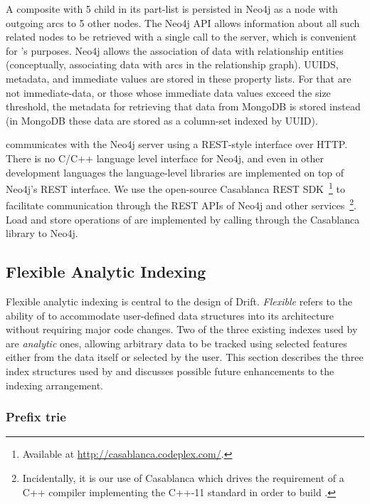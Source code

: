 A composite \dpart with 5 child \dparts in its part-list is persisted in Neo4j as a \dpart node with
outgoing arcs to 5 other \dpart nodes.  The Neo4j API allows information about all such related nodes to
be retrieved with a single call to the server, which is convenient for \driftd's purposes.
Neo4j allows the association of data with relationship entities (conceptually, associating data with arcs
in the relationship graph).  \dpart UUIDS, metadata, and immediate \dpart values are stored in these
property lists.  For \dparts that are not immediate-data, or those whose immediate data values exceed the
size threshold, the metadata for retrieving that data from MongoDB is stored instead (in MongoDB these
data are stored as a column-set indexed by UUID).  

\driftd communicates with the Neo4j server using a REST-style interface over HTTP.  There is no C/C++
language level interface for Neo4j, and even in other development languages the language-level libraries
are implemented on top of Neo4j's REST interface.  We use the open-source
Casablanca REST SDK~\footnote{Available at \url{http://casablanca.codeplex.com/}.} to facilitate
communication through the REST APIs of Neo4j and other services~\footnote{Incidentally, it is our use of
  Casablanca which drives the requirement of a C++ compiler implementing the C++-11 standard in order to
  build \driftd.}.  Load and store operations of \dparts are implemented by calling through the
Casablanca library to Neo4j.  


\subsection{Flexible Analytic Indexing}

Flexible analytic indexing is central to the design of Drift.  \emph{Flexible} refers to the ability of
\driftd to accommodate user-defined data structures into its architecture without requiring major code
changes.  Two of the three existing indexes used by \driftd are \emph{analytic} ones, allowing arbitrary
data to be tracked using selected features either from the data itself or selected by the user.  This
section describes the three index structures used by \driftd and discusses possible future enhancements
to the indexing arrangement.

\subsubsection{Prefix trie}

